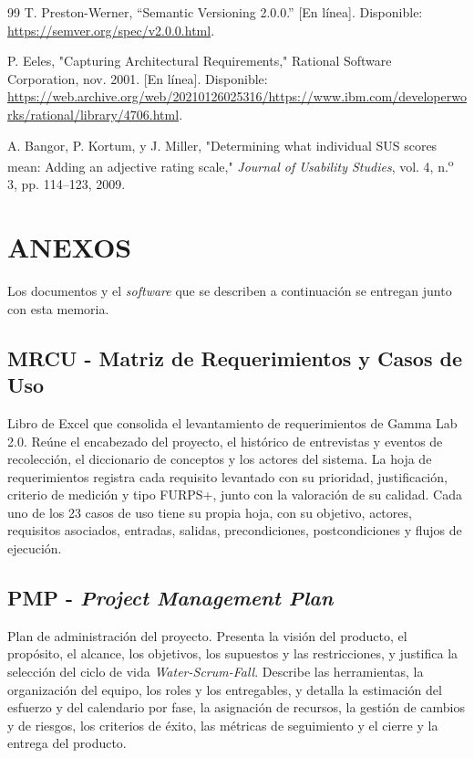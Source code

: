 \documentclass[12pt,letterpaper,oneside]{article}
\newcommand{\capitulo}[1]{\clearpage\section{#1}}
\begin{document}
\begin{thebibliography}{99}
 T. Preston-Werner, ``Semantic Versioning 2.0.0.'' [En línea]. Disponible: \url{https://semver.org/spec/v2.0.0.html}.

 P. Eeles, "Capturing Architectural Requirements," Rational Software Corporation, nov. 2001. [En línea]. Disponible: \url{https://web.archive.org/web/20210126025316/https://www.ibm.com/developerworks/rational/library/4706.html}.

 A. Bangor, P. Kortum, y J. Miller, "Determining what individual SUS scores mean: Adding an adjective rating scale," \textit{Journal of Usability Studies}, vol. 4, n.\textsuperscript{o} 3, pp. 114--123, 2009.

\end{thebibliography}
\endgroup

\capitulo{ANEXOS}

Los documentos y el \textit{software} que se describen a continuación se entregan junto con esta memoria.

\subsection{MRCU - Matriz de Requerimientos y Casos de Uso}
\label{anx:mrcu}
Libro de Excel que consolida el levantamiento de requerimientos de Gamma Lab 2.0. Reúne el encabezado del proyecto, el histórico de entrevistas y eventos de recolección, el diccionario de conceptos y los actores del sistema. La hoja de requerimientos registra cada requisito levantado con su prioridad, justificación, criterio de medición y tipo FURPS+, junto con la valoración de su calidad. Cada uno de los 23 casos de uso tiene su propia hoja, con su objetivo, actores, requisitos asociados, entradas, salidas, precondiciones, postcondiciones y flujos de ejecución.

\subsection{PMP - \textit{Project Management Plan}}
\label{anx:pmp}
Plan de administración del proyecto. Presenta la visión del producto, el propósito, el alcance, los objetivos, los supuestos y las restricciones, y justifica la selección del ciclo de vida \textit{Water-Scrum-Fall}. Describe las herramientas, la organización del equipo, los roles y los entregables, y detalla la estimación del esfuerzo y del calendario por fase, la asignación de recursos, la gestión de cambios y de riesgos, los criterios de éxito, las métricas de seguimiento y el cierre y la entrega del producto.
\end{document}

